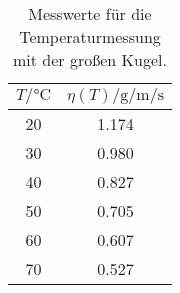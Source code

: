 \begin{table}[h]
  \centering
  \caption{Messwerte für die Temperaturmessung mit der großen Kugel.}
  \label{tab:FallTemp}
  \begin{tabular}{c c}
    \toprule
    $T/\si{\celsius}$ & $\eta(T)/\si{\gram\per\meter\per\second}$ \\
    \midrule
    20 & 1.174 \\
    30 & 0.980 \\
    40 & 0.827 \\
    50 & 0.705 \\
    60 & 0.607 \\
    70 & 0.527 \\
    \bottomrule
  \end{tabular}
\end{table}
